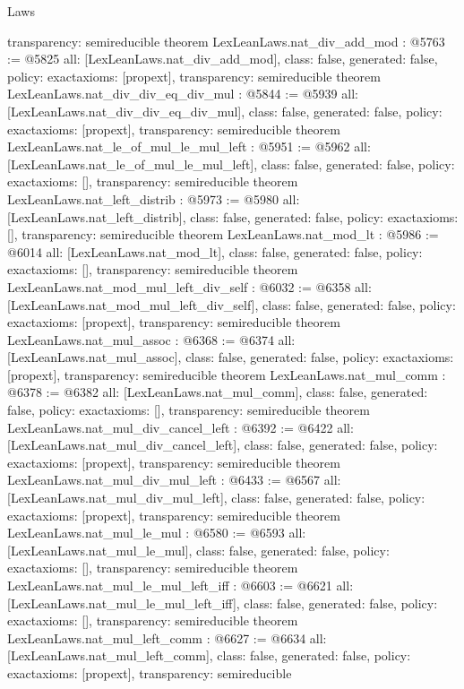 \begin{lexlean}{Laws}
\begin{coremodule}
{  transparency: semireducible
}
theorem LexLeanLaws.nat_div_add_mod : @5763 := @5825 {
  all: [LexLeanLaws.nat_div_add_mod],
  class: false,
  generated: false,
  policy: exact{axioms: [propext]},
  transparency: semireducible
}
theorem LexLeanLaws.nat_div_div_eq_div_mul : @5844 := @5939 {
  all: [LexLeanLaws.nat_div_div_eq_div_mul],
  class: false,
  generated: false,
  policy: exact{axioms: [propext]},
  transparency: semireducible
}
theorem LexLeanLaws.nat_le_of_mul_le_mul_left : @5951 := @5962 {
  all: [LexLeanLaws.nat_le_of_mul_le_mul_left],
  class: false,
  generated: false,
  policy: exact{axioms: []},
  transparency: semireducible
}
theorem LexLeanLaws.nat_left_distrib : @5973 := @5980 {
  all: [LexLeanLaws.nat_left_distrib],
  class: false,
  generated: false,
  policy: exact{axioms: []},
  transparency: semireducible
}
theorem LexLeanLaws.nat_mod_lt : @5986 := @6014 {
  all: [LexLeanLaws.nat_mod_lt],
  class: false,
  generated: false,
  policy: exact{axioms: []},
  transparency: semireducible
}
theorem LexLeanLaws.nat_mod_mul_left_div_self : @6032 := @6358 {
  all: [LexLeanLaws.nat_mod_mul_left_div_self],
  class: false,
  generated: false,
  policy: exact{axioms: [propext]},
  transparency: semireducible
}
theorem LexLeanLaws.nat_mul_assoc : @6368 := @6374 {
  all: [LexLeanLaws.nat_mul_assoc],
  class: false,
  generated: false,
  policy: exact{axioms: [propext]},
  transparency: semireducible
}
theorem LexLeanLaws.nat_mul_comm : @6378 := @6382 {
  all: [LexLeanLaws.nat_mul_comm],
  class: false,
  generated: false,
  policy: exact{axioms: []},
  transparency: semireducible
}
theorem LexLeanLaws.nat_mul_div_cancel_left : @6392 := @6422 {
  all: [LexLeanLaws.nat_mul_div_cancel_left],
  class: false,
  generated: false,
  policy: exact{axioms: [propext]},
  transparency: semireducible
}
theorem LexLeanLaws.nat_mul_div_mul_left : @6433 := @6567 {
  all: [LexLeanLaws.nat_mul_div_mul_left],
  class: false,
  generated: false,
  policy: exact{axioms: [propext]},
  transparency: semireducible
}
theorem LexLeanLaws.nat_mul_le_mul : @6580 := @6593 {
  all: [LexLeanLaws.nat_mul_le_mul],
  class: false,
  generated: false,
  policy: exact{axioms: []},
  transparency: semireducible
}
theorem LexLeanLaws.nat_mul_le_mul_left_iff : @6603 := @6621 {
  all: [LexLeanLaws.nat_mul_le_mul_left_iff],
  class: false,
  generated: false,
  policy: exact{axioms: []},
  transparency: semireducible
}
theorem LexLeanLaws.nat_mul_left_comm : @6627 := @6634 {
  all: [LexLeanLaws.nat_mul_left_comm],
  class: false,
  generated: false,
  policy: exact{axioms: [propext]},
  transparency: semireducible
}
\end{coremodule}
\end{lexlean}
